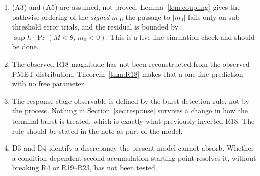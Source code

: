 \documentclass[11pt,a4paper]{article}
\newcommand{\Mrv}{M}
\theoremstyle{plain}
\theoremstyle{remark}
\begin{document}
\begin{enumerate}
\item (A3) and (A5) are assumed, not proved. Lemma~\ref{lem:coupling} gives the pathwise
ordering of the \emph{signed} $m_0$; the passage to $|m_0|$ fails only on sub-threshold
error trials, and the residual is bounded by $\sup h\cdot\Pr(\Mrv<\theta,\,m_0<0)$. This is
a five-line simulation check and should be done.
\item The observed R18 magnitude has not been reconstructed from the observed PMET
distribution. Theorem~\ref{thm:R18} makes that a one-line prediction with no free
parameter.
\item The response-stage observable is defined by the burst-detection rule, not by the
process. Nothing in Section~\ref{sec:response} survives a change in how the terminal burst
is treated, which is exactly what previously inverted R18. The rule should be stated in
the note as part of the model.
\item D3 and D4 identify a discrepancy the present model cannot absorb. Whether a
condition-dependent second-accumulation starting point resolves it, without breaking R4 or
R19--R23, has not been tested.
\end{enumerate}



\end{document}
